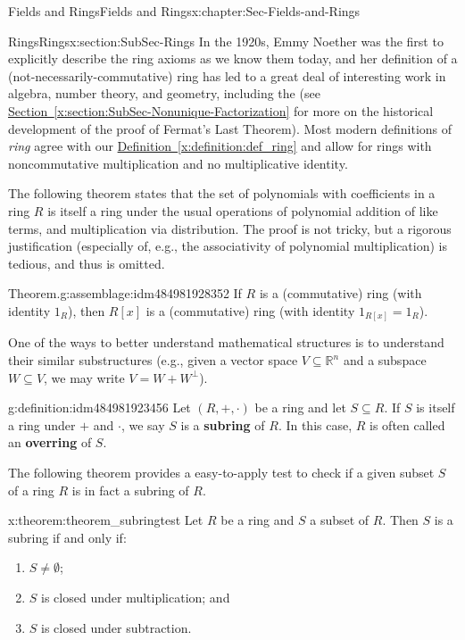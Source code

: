 \documentclass[oneside,10pt,]{book}
\newcommand{\xreffont}{\relax}
\newcommand{\terminology}[1]{\textbf{#1}}
\numberwithin{equation}{section}
\def\R{{\mathbb R}}
\begin{document}
\begin{chapterptx}{Fields and Rings}{}{Fields and Rings}{}{}{x:chapter:Sec-Fields-and-Rings}
\begin{sectionptx}{Rings}{}{Rings}{}{}{x:section:SubSec-Rings}
In the 1920s, Emmy Noether was the first to explicitly describe the ring axioms as we know them today, and her definition of a (not-necessarily-commutative) ring has led to a great deal of interesting work in algebra, number theory, and geometry, including the (see \hyperref[x:section:SubSec-Nonunique-Factorization]{Section~{\xreffont\ref{x:section:SubSec-Nonunique-Factorization}}} for more on the historical development of the proof of Fermat's Last Theorem). Most modern definitions of \emph{ring} agree with our \hyperref[x:definition:def_ring]{Definition~{\xreffont\ref{x:definition:def_ring}}} and allow for rings with noncommutative multiplication and no multiplicative identity.%
\par
The following theorem states that the set of polynomials with coefficients in a ring \(R\) is itself a ring under the usual operations of polynomial addition of like terms, and multiplication via distribution. The proof is not tricky, but a rigorous justification (especially of, e.g., the associativity of polynomial multiplication) is tedious, and thus is omitted.%
\begin{assemblage}{Theorem.}{g:assemblage:idm484981928352}%
If \(R\) is a (commutative) ring (with identity \(1_R\)), then \(R[x]\) is a (commutative) ring (with identity \(1_{R[x]} = 1_R\)).%
\end{assemblage}
One of the ways to better understand mathematical structures is to understand their similar substructures (e.g., given a vector space \(V\subseteq \R^n\) and a subspace \(W\subseteq V\), we may write \(V = W + W^\perp\)). %
\begin{definition}{}{g:definition:idm484981923456}%
%
%
Let \((R,+,\cdot)\) be a ring and let \(S\subseteq R\). If \(S\) is itself a ring under \(+\) and \(\cdot\), we say \(S\) is a \terminology{subring} of \(R\). In this case, \(R\) is often called an \terminology{overring} of \(S\).%
\end{definition}
The following theorem provides a easy-to-apply test to check if a given subset \(S\) of a ring \(R\) is in fact a subring of \(R\).%
\begin{theorem}{}{}{x:theorem:theorem_subringtest}%
%
Let \(R\) be a ring and \(S\) a subset of \(R\). Then \(S\) is a subring if and only if:%
\begin{enumerate}
\item{}\(S\ne \emptyset\);%
\item{}\(S\) is closed under multiplication; and%
\item{}\(S\) is closed under subtraction.%

\end{enumerate}
\end{theorem}
\end{sectionptx}
\end{chapterptx}
\end{document}
